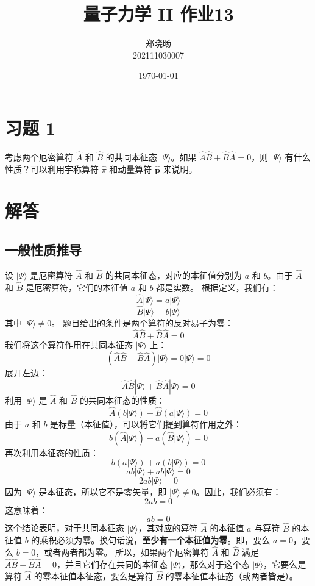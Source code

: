 \documentclass[12pt, a4paper]{article}
\begin{document}
\title{量子力学 II 作业13}
\author{郑晓旸 \\ 202111030007}
\date{\today}
\maketitle
\section*{习题 1}
考虑两个厄密算符 \(\hat{A}\) 和 \(\hat{B}\) 的共同本征态 \(|\Psi\rangle\)。如果 \(\hat{A}\hat{B} + \hat{B}\hat{A} = 0\)，则 \(|\Psi\rangle\) 有什么性质？可以利用宇称算符 \(\hat{\pi}\) 和动量算符 \(\hat{\bm{p}}\) 来说明。
\section{解答}
\subsection{一般性质推导}
设 \(|\Psi\rangle\) 是厄密算符 \(\hat{A}\) 和 \(\hat{B}\) 的共同本征态，对应的本征值分别为 \(a\) 和 \(b\)。由于 \(\hat{A}\) 和 \(\hat{B}\) 是厄密算符，它们的本征值 \(a\) 和 \(b\) 都是实数。
根据定义，我们有：
\[ \hat{A}|\Psi\rangle = a|\Psi\rangle \]
\[ \hat{B}|\Psi\rangle = b|\Psi\rangle \]
其中 \(|\Psi\rangle \neq 0\)。
题目给出的条件是两个算符的反对易子为零：
\[ \hat{A}\hat{B} + \hat{B}\hat{A} = 0 \]
我们将这个算符作用在共同本征态 \(|\Psi\rangle\) 上：
\[ (\hat{A}\hat{B} + \hat{B}\hat{A})|\Psi\rangle = 0 |\Psi\rangle = 0 \]
展开左边：
\[ \hat{A}\hat{B}|\Psi\rangle + \hat{B}\hat{A}|\Psi\rangle = 0 \]
利用 \(|\Psi\rangle\) 是 \(\hat{A}\) 和 \(\hat{B}\) 的共同本征态的性质：
\[ \hat{A}(b|\Psi\rangle) + \hat{B}(a|\Psi\rangle) = 0 \]
由于 \(a\) 和 \(b\) 是标量（本征值），可以将它们提到算符作用之外：
\[ b(\hat{A}|\Psi\rangle) + a(\hat{B}|\Psi\rangle) = 0 \]
再次利用本征态的性质：
\[ b(a|\Psi\rangle) + a(b|\Psi\rangle) = 0 \]
\[ ab|\Psi\rangle + ab|\Psi\rangle = 0 \]
\[ 2ab|\Psi\rangle = 0 \]
因为 \(|\Psi\rangle\) 是本征态，所以它不是零矢量，即 \(|\Psi\rangle \neq 0\)。因此，我们必须有：
\[ 2ab = 0 \]
这意味着：
\[ ab = 0 \]
这个结论表明，对于共同本征态 \(|\Psi\rangle\)，其对应的算符 \(\hat{A}\) 的本征值 \(a\) 与算符 \(\hat{B}\) 的本征值 \(b\) 的乘积必须为零。换句话说，\textbf{至少有一个本征值为零}。即，要么 \(a=0\)，要么 \(b=0\)，或者两者都为零。
所以，如果两个厄密算符 \(\hat{A}\) 和 \(\hat{B}\) 满足 \(\hat{A}\hat{B} + \hat{B}\hat{A} = 0\)，并且它们存在共同的本征态 \(|\Psi\rangle\)，那么对于这个态 \(|\Psi\rangle\)，它要么是算符 \(\hat{A}\) 的零本征值本征态，要么是算符 \(\hat{B}\) 的零本征值本征态（或两者皆是）。
\end{document}
